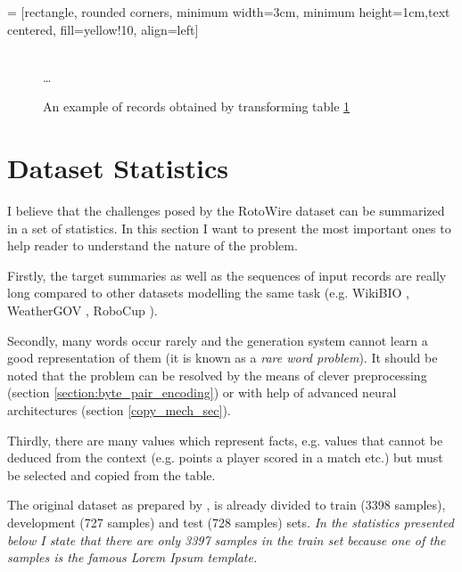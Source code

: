  = [rectangle, rounded corners, minimum width=3cm, minimum height=1cm,text centered, fill=yellow!10, align=left]

\begin{figure}[!h]
    \centering
    \usetikzlibrary{shapes.multipart}
    \\ \dots
    \caption{An example of records obtained by transforming table \ref{ex_seq_rec}} \label{ex_seq_rec}
\end{figure}

\section{Dataset Statistics} \label{assumptions_ref}

I believe that the challenges posed by the RotoWire dataset can be summarized in a set of statistics. In this section I want to present the most important ones to help reader to understand the nature of the problem. 

Firstly, the target summaries as well as the sequences of input records are really long compared to other datasets modelling the same task (e.g. WikiBIO \citep{lebret2016neural}, WeatherGOV \citep{liang-etal-2009-learning}, RoboCup \citep{chen2008robocup}).

Secondly, many words occur rarely and the generation system cannot learn a good representation of them (it is known as a \emph{rare word problem}). It should be noted that the problem can be resolved by the means of clever preprocessing (section \ref{section:byte_pair_encoding}) or with help of advanced neural architectures (section \ref{copy_mech_sec}).

Thirdly, there are many values which represent facts, e.g. values that cannot be deduced from the context (e.g. points a player scored in a match etc.) but must be selected and copied from the table.

The original dataset as prepared by \citep{wiseman2017}, is already divided to train (3398 samples), development (727 samples) and test (728 samples) sets. \emph{In the statistics presented below I state that there are only 3397 samples in the train set because one of the samples is the famous Lorem Ipsum template.}

